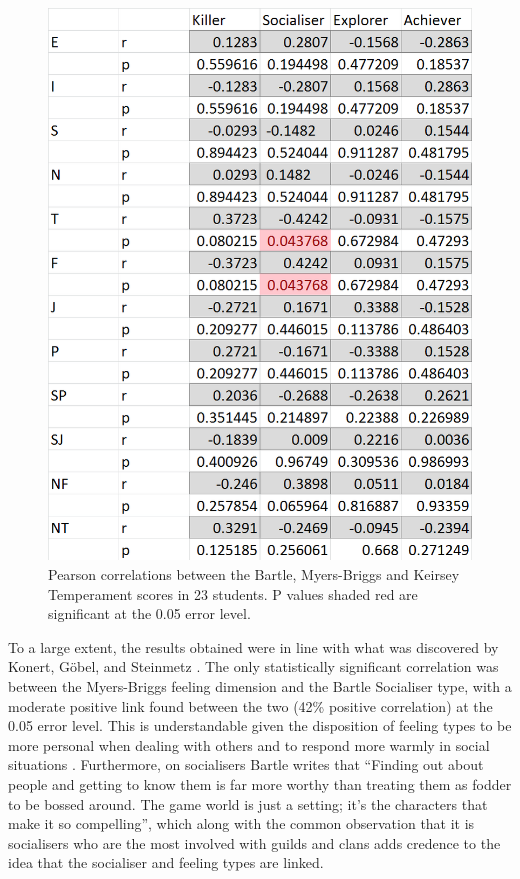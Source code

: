 \documentclass[12pt,a4paper,twoside]{report}
\begin{document}
\begin{figure}
	\begin{center}
		\includegraphics[width=1\textwidth]{../img/results.png}
		\caption{Pearson correlations between the Bartle, Myers-Briggs and Keirsey Temperament scores in 23 students. P values shaded red are significant at the 0.05 error level.}
		\label{results}
	\end{center}
\end{figure}

To a large extent, the results obtained were in line with what was discovered by Konert, G{\"o}bel, and Steinmetz \cite{konertmodeling}. The only statistically significant correlation was between the Myers-Briggs feeling dimension and the Bartle Socialiser type, with a moderate positive link found between the two (42\% positive correlation) at the 0.05 error level. This is understandable given the disposition of feeling types to be more personal when dealing with others and to respond more warmly in social situations \cite{keirsey1984}. Furthermore, on socialisers Bartle writes that ``Finding out about people and getting to know them is far more worthy than treating them as fodder to be bossed around. The game world is just a setting; it's the characters that make it so compelling''\cite{bartle1996hearts}, which along with the common observation that it is socialisers who are the most involved with guilds and clans adds credence to the idea that the socialiser and feeling types are linked. 
\end{document}
